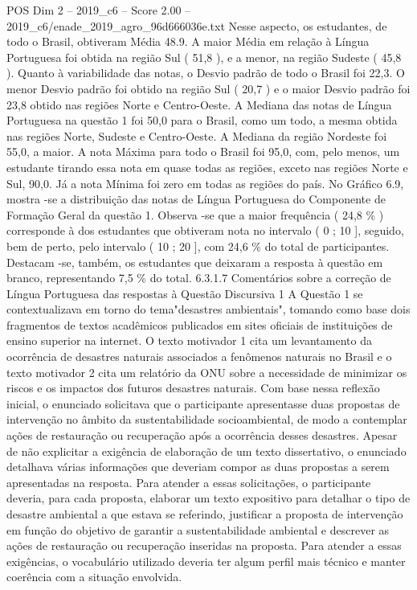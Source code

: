\begin{textsample}{POS Dim 2 – 2019\_c6 – Score 2.00 – 2019\_c6/enade\_2019\_agro\_96d666036e.txt}
Nesse aspecto, os estudantes, de todo o Brasil, obtiveram Média 48.9.
A maior Média em relação à Língua Portuguesa foi obtida na região Sul ( 51,8 ), e a menor, na região Sudeste ( 45,8 ).
Quanto à variabilidade das notas, o Desvio padrão de todo o Brasil foi 22,3.
O menor Desvio padrão foi obtido na região Sul ( 20,7 ) e o maior Desvio padrão foi 23,8 obtido nas regiões Norte e Centro-Oeste.
A Mediana das notas de Língua Portuguesa na questão 1 foi 50,0 para o Brasil, como um todo, a mesma obtida nas regiões Norte, Sudeste e Centro-Oeste.
A Mediana da região Nordeste foi 55,0, a maior.
A nota Máxima para todo o Brasil foi 95,0, com, pelo menos, um estudante tirando essa nota em quase todas as regiões, exceto nas regiões Norte e Sul, 90,0.
Já a nota Mínima foi zero em todas as regiões do país.
No Gráfico 6.9, mostra -se a distribuição das notas de Língua Portuguesa do Componente de Formação Geral da questão 1.
Observa -se que a maior frequência ( 24,8 \% ) corresponde à dos estudantes que obtiveram nota no intervalo ( 0 ; 10 ], seguido, bem de perto, pelo intervalo ( 10 ; 20 ], com 24,6 \% do total de participantes.
Destacam -se, também, os estudantes que deixaram a resposta à questão em branco, representando 7,5 \% do total. 6.3.1.7 Comentários sobre a correção de Língua Portuguesa das respostas à Questão Discursiva 1 A Questão 1 se contextualizava em torno do tema"desastres ambientais", tomando como base dois fragmentos de textos acadêmicos publicados em sites oficiais de instituições de ensino superior na internet.
O texto motivador 1 cita um levantamento da ocorrência de desastres naturais associados a fenômenos naturais no Brasil e o texto motivador 2 cita um relatório da ONU sobre a necessidade de minimizar os riscos e os impactos dos futuros desastres naturais.
Com base nessa reflexão inicial, o enunciado solicitava que o participante apresentasse duas propostas de intervenção no âmbito da sustentabilidade socioambiental, de modo a contemplar ações de restauração ou recuperação após a ocorrência desses desastres.
Apesar de não explicitar a exigência de elaboração de um texto dissertativo, o enunciado detalhava várias informações que deveriam compor as duas propostas a serem apresentadas na resposta.
Para atender a essas solicitações, o participante deveria, para cada proposta, elaborar um texto expositivo para detalhar o tipo de desastre ambiental a que estava se referindo, justificar a proposta de intervenção em função do objetivo de garantir a sustentabilidade ambiental e descrever as ações de restauração ou recuperação inseridas na proposta.
Para atender a essas exigências, o vocabulário utilizado deveria ter algum perfil mais técnico e manter coerência com a situação envolvida.

\end{textsample}
